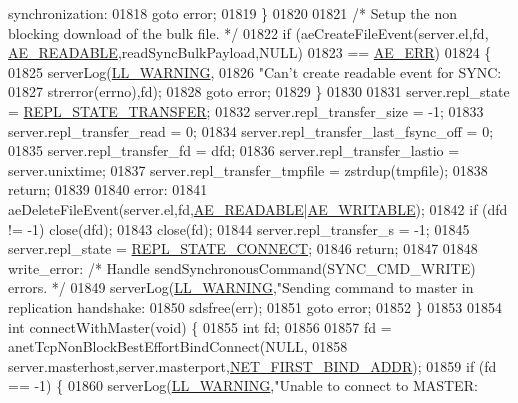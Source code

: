 \begin{DoxyCode}
{{{{{{{{{{{{{{{{{{{{{{{{{{{{{{{{{{{{{{{{{{{{{{{{{{{{{{{{{{{{{{{{{{{{       synchronization: %
01818         \textcolor{keywordflow}{goto} error;
01819     \}
01820 
01821     \textcolor{comment}{/* Setup the non blocking download of the bulk file. */}
01822     \textcolor{keywordflow}{if} (aeCreateFileEvent(server.el,fd, \hyperlink{ae_8h_a7a9a2162d007d09739955b4e55c65bf3}{AE\_READABLE},readSyncBulkPayload,NULL)
01823             == \hyperlink{ae_8h_aa16dcf7effdf8f8df97f51b1cb51a9df}{AE\_ERR})
01824     \{
01825         serverLog(\hyperlink{server_8h_a31229b9334bba7d6be2a72970967a14b}{LL\_WARNING},
01826             \textcolor{stringliteral}{"Can't create readable event for SYNC: %
01827             strerror(errno),fd);
01828         \textcolor{keywordflow}{goto} error;
01829     \}
01830 
01831     server.repl\_state = \hyperlink{server_8h_a1d27594a2d9c8d24e4ed5a2e88d1113e}{REPL\_STATE\_TRANSFER};
01832     server.repl\_transfer\_size = -1;
01833     server.repl\_transfer\_read = 0;
01834     server.repl\_transfer\_last\_fsync\_off = 0;
01835     server.repl\_transfer\_fd = dfd;
01836     server.repl\_transfer\_lastio = server.unixtime;
01837     server.repl\_transfer\_tmpfile = zstrdup(tmpfile);
01838     \textcolor{keywordflow}{return};
01839 
01840 error:
01841     aeDeleteFileEvent(server.el,fd,\hyperlink{ae_8h_a7a9a2162d007d09739955b4e55c65bf3}{AE\_READABLE}|\hyperlink{ae_8h_ab6bfb0366ccb6277112d132c2a2bf500}{AE\_WRITABLE});
01842     \textcolor{keywordflow}{if} (dfd != -1) close(dfd);
01843     close(fd);
01844     server.repl\_transfer\_s = -1;
01845     server.repl\_state = \hyperlink{server_8h_adfe013d4a620f0b98b47b2144760e69f}{REPL\_STATE\_CONNECT};
01846     \textcolor{keywordflow}{return};
01847 
01848 write\_error: \textcolor{comment}{/* Handle sendSynchronousCommand(SYNC\_CMD\_WRITE) errors. */}
01849     serverLog(\hyperlink{server_8h_a31229b9334bba7d6be2a72970967a14b}{LL\_WARNING},\textcolor{stringliteral}{"Sending command to master in replication handshake: %
01850     sdsfree(err);
01851     \textcolor{keywordflow}{goto} error;
01852 \}
01853 
01854 \textcolor{keywordtype}{int} connectWithMaster(\textcolor{keywordtype}{void}) \{
01855     \textcolor{keywordtype}{int} fd;
01856 
01857     fd = anetTcpNonBlockBestEffortBindConnect(NULL,
01858         server.masterhost,server.masterport,\hyperlink{server_8h_a53b900c09238a4ff78e0af9574335dfd}{NET\_FIRST\_BIND\_ADDR});
01859     \textcolor{keywordflow}{if} (fd == -1) \{
01860         serverLog(\hyperlink{server_8h_a31229b9334bba7d6be2a72970967a14b}{LL\_WARNING},\textcolor{stringliteral}{"Unable to connect to MASTER: %
}}}}}}}}}}}}}}}}}}}}}}}}}}}}}}}}}}}}}}}}}}}}}}}}}}}}}}}}}}}}}}}}}}}}}}}
\end{DoxyCode}

